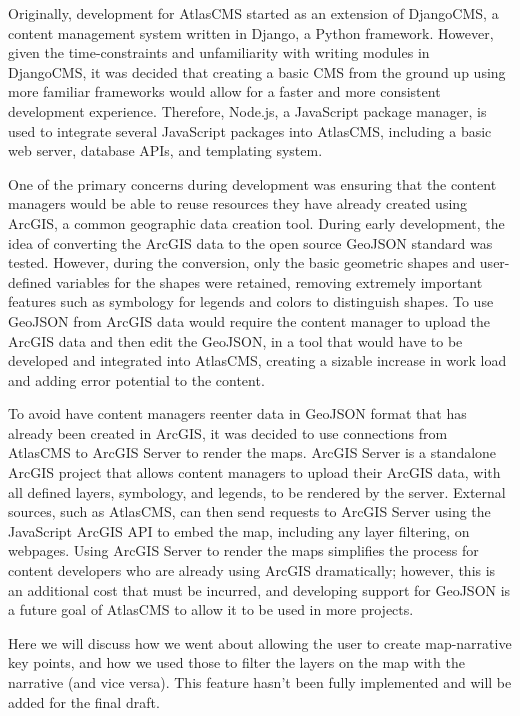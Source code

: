 \documentclass[11pt, draftcls, conference, onecolumn]{IEEEtran}
\begin{document}
Originally, development for AtlasCMS started as an extension of DjangoCMS, a content management system written in Django, a Python framework. However, given the time-constraints and unfamiliarity with writing modules in DjangoCMS, it was decided that creating a basic CMS from the ground up using more familiar frameworks would allow for a faster and more consistent development experience. Therefore, Node.js, a JavaScript package manager, is used to integrate several JavaScript packages into AtlasCMS, including a basic web server, database APIs, and templating system.

One of the primary concerns during development was ensuring that the content managers would be able to reuse resources they have already created using ArcGIS, a common geographic data creation tool. During early development, the idea of converting the ArcGIS data to the open source GeoJSON standard was tested. However, during the conversion, only the basic geometric shapes and user-defined variables for the shapes were retained, removing extremely important features such as symbology for legends and colors to distinguish shapes. To use GeoJSON from ArcGIS data would require the content manager to upload the ArcGIS data and then edit the GeoJSON, in a tool that would have to be developed and integrated into AtlasCMS, creating a sizable increase in work load and adding error potential to the content.

To avoid have content managers reenter data in GeoJSON format that has already been created in ArcGIS, it was decided to use connections from AtlasCMS to ArcGIS Server to render the maps. ArcGIS Server is a standalone ArcGIS project that allows content managers to upload their ArcGIS data, with all defined layers, symbology, and legends, to be rendered by the server. External sources, such as AtlasCMS, can then send requests to ArcGIS Server using the JavaScript ArcGIS API to embed the map, including any layer filtering, on webpages. Using ArcGIS Server to render the maps simplifies the process for content developers who are already using ArcGIS dramatically; however, this is an additional cost that must be incurred, and developing support for GeoJSON is a future goal of AtlasCMS to allow it to be used in more projects.

Here we will discuss how we went about allowing the user to create map-narrative key points, and how we used those to filter the layers on the map with the narrative (and vice versa). This feature hasn't been fully implemented and will be added for the final draft.
\end{document}
